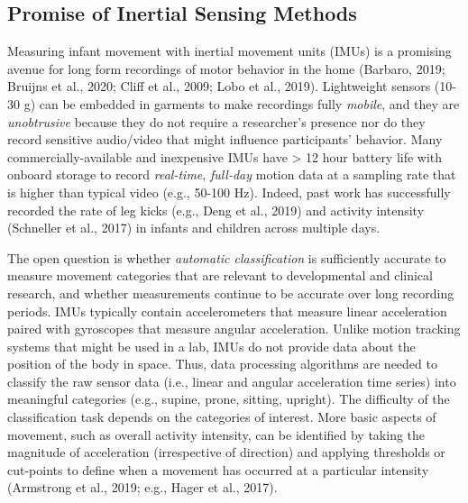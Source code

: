 \documentclass[
  man]{apa6}
\begin{document}
\hypertarget{promise-of-inertial-sensing-methods}{%
\subsection{Promise of Inertial Sensing Methods}\label{promise-of-inertial-sensing-methods}}

Measuring infant movement with inertial movement units (IMUs) is a promising avenue for long form recordings of motor behavior in the home (Barbaro, 2019; Bruijns et al., 2020; Cliff et al., 2009; Lobo et al., 2019). Lightweight sensors (10-30 g) can be embedded in garments to make recordings fully \emph{mobile}, and they are \emph{unobtrusive} because they do not require a researcher's presence nor do they record sensitive audio/video that might influence participants' behavior. Many commercially-available and inexpensive IMUs have \textgreater{} 12 hour battery life with onboard storage to record \emph{real-time}, \emph{full-day} motion data at a sampling rate that is higher than typical video (e.g., 50-100 Hz). Indeed, past work has successfully recorded the rate of leg kicks (e.g., Deng et al., 2019) and activity intensity (Schneller et al., 2017) in infants and children across multiple days.

The open question is whether \emph{automatic classification} is sufficiently accurate to measure movement categories that are relevant to developmental and clinical research, and whether measurements continue to be accurate over long recording periods. IMUs typically contain accelerometers that measure linear acceleration paired with gyroscopes that measure angular acceleration. Unlike motion tracking systems that might be used in a lab, IMUs do not provide data about the position of the body in space. Thus, data processing algorithms are needed to classify the raw sensor data (i.e., linear and angular acceleration time series) into meaningful categories (e.g., supine, prone, sitting, upright). The difficulty of the classification task depends on the categories of interest. More basic aspects of movement, such as overall activity intensity, can be identified by taking the magnitude of acceleration (irrespective of direction) and applying thresholds or cut-points to define when a movement has occurred at a particular intensity (Armstrong et al., 2019; e.g., Hager et al., 2017).
\end{document}
